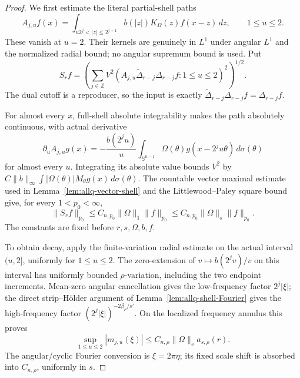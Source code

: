 \documentclass[11pt]{article}
\numberwithin{equation}{section}
\theoremstyle{remark}
\theoremstyle{definition}
\newcommand{\Sph}{\mathbb S}
\begin{document}
\begin{proof}
We first estimate the literal partial-shell paths
\[
 A_{j,u}f(x)=\int_{u2^j<|z|\le2^{j+1}}
 b(|z|)K_\Omega(z)f(x-z)\,dz,\qquad 1\le u\le2.
\]
These vanish at $u=2$.  Their kernels are genuinely in $L^1$ under
angular $L^1$ and the normalized radial bound; no
angular supremum bound is used.  Put
\[
 S_rf=\left(\sum_{j\in\mathbb Z}
 V^2(A_{j,u}\widetilde\Delta_{r-j}\Delta_{r-j}f:1\le u\le2)^2
 \right)^{1/2}.
\]
The dual cutoff is a reproducer, so the input is exactly
$\widetilde\Delta_{r-j}\Delta_{r-j}f=\Delta_{r-j}f$.

For almost every $x$, full-shell absolute integrability makes the path
absolutely continuous, with actual derivative
\[
 \partial_u A_{j,u}g(x)
 =-\frac{b(2^ju)}u\int_{\Sph^{n-1}}\Omega(\theta)
                            g(x-2^ju\theta)\,d\sigma(\theta)
\]
for almost every $u$.  Integrating its absolute value bounds $V^2$ by
$C\|b\|_\infty\int|\Omega(\theta)|M_\theta g(x)\,d\sigma(\theta)$.
The countable vector maximal estimate used in
Lemma~\ref{lem:allq-vector-shell} and the Littlewood--Paley square
bound give, for every $1<p_0<\infty$,
\begin{equation}\label{eq:allq-short-uniform}
 \|S_rf\|_{p_0}\le C_{n,p_0}\|\Omega\|_1\|f\|_{p_0}
 \le C_{n,p_0}\|\Omega\|_s\|f\|_{p_0}.
\end{equation}
The constants are fixed before $r,s,\Omega,b,f$.

To obtain decay, apply the finite-variation radial estimate on the
actual interval $(u,2]$, uniformly for $1\le u\le2$.
The zero-extension of $v\mapsto b(2^jv)/v$ on this interval has
uniformly bounded $\rho$-variation, including the two endpoint
increments. Mean-zero angular cancellation gives
the low-frequency factor $2^j|\xi|$; the direct strip--H\"older
argument of Lemma~\ref{lem:allq-shell-Fourier} gives the high-frequency
factor $(2^j|\xi|)^{-2\beta_\rho/s'}$.
On the localized frequency annulus this proves
\begin{equation}\label{eq:allq-partial-shell-envelope}
 \sup_{1\le u\le2}|m_{j,u}(\xi)|
 \le C_{n,\rho}\|\Omega\|_s a_{s,\rho}(r).
\end{equation}
The angular/cyclic Fourier conversion is $\xi=2\pi\eta$;
its fixed scale shift is absorbed into $C_{n,\rho}$, uniformly in $s$.


\end{proof}
\end{document}
